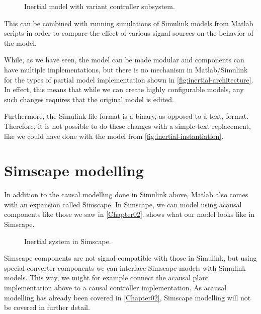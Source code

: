 \documentclass[\rootfolder/main.tex]{subfiles}
\begin{document}
\begin{figure}[ht]
    \centering
    {
        \footnotesize
        
    }
    {
        \footnotesize
        
    }
    \caption{Inertial model with variant controller subsystem.\label{fig:inertial-simulink-variant}}
\end{figure}

This can be combined with running simulations of Simulink models from Matlab scripts in order to compare the effect of various signal sources on the behavior of the model.

While, as we have seen, the model can be made modular and components can have multiple implementations, but there is no mechanism in Matlab/Simulink for
the types of partial model implementation shown in \cref{fig:inertial-architecture}.
In effect, this means that while we can create highly configurable models, any such changes requires that the original model is edited.

Furthermore, the Simulink file format is a binary, as opposed to a text, format.
Therefore, it is not possible to do these changes with a simple text replacement, like we could have done with the model from \cref{fig:inertial-instantiation}.

\section{Simscape modelling}

In addition to the causal modelling done in Simulink above, Matlab also comes with an expansion called Simscape.
In Simscape, we can model using acausal components like those we saw in \ref{Chapter02}.
 shows what our model looks like in Simscape.

\begin{figure}[ht]
    \centering
        \tiny
        
    \caption{Inertial system in Simscape.\label{fig:inertial-simscape}}
\end{figure}

Simscape components are not signal-compatible with those in Simulink, but using special converter components we can interface Simscape models with Simulink models.
This way, we might for example connect the acausal plant implementation above to a causal controller implementation.
As acausal modelling has already been covered in \ref{Chapter02}, Simscape modelling will not be covered in further detail.
\end{document}
